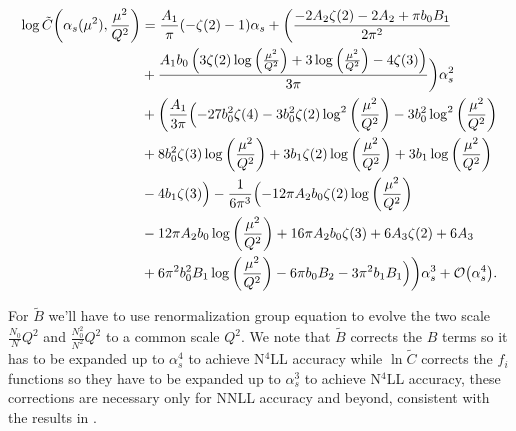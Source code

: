 \documentclass[../Tesi_Jiahao_Miao_986136.tex]{subfiles}
\begin{document}
\begin{align}
    \begin{split}
    \log \tilde{C}\qty(\alpha_s(\mu^2), \frac{\mu^2}{Q^2}) &= \frac{A_1}{\pi } (-\zeta (2)-1) \alpha_s + \biggl(\frac{-2 A_2 \zeta (2)-2 A_2+\pi  b_0 B_1}{2 \pi ^2}\\
    &+\frac{A_1 b_0 \left(3 \zeta (2) \log \left(\frac{\mu ^2}{Q^2}\right)+3 \log \left(\frac{\mu ^2}{Q^2}\right) -4 \zeta (3)\right)}{3 \pi }\biggr)\alpha_s^2\\
    &+\biggl(\frac{A_1}{3 \pi } \Bigl(-27 b_0^2 \zeta (4)-3 b_0^2 \zeta (2) \log ^2\left(\frac{\mu ^2}{Q^2}\right)-3 b_0^2 \log ^2\left(\frac{\mu ^2}{Q^2}\right)\\
    &+8 b_0^2 \zeta (3) \log \left(\frac{\mu ^2}{Q^2}\right)+3 b_1 \zeta (2) \log \left(\frac{\mu ^2}{Q^2}\right)+3 b_1 \log \left(\frac{\mu ^2}{Q^2}\right)\\
    &-4 b_1 \zeta (3)\Bigr)-\frac{1}{6 \pi ^3}\Bigl(-12 \pi  A_2 b_0 \zeta (2) \log \left(\frac{\mu ^2}{Q^2}\right)\\
    &-12 \pi  A_2 b_0 \log \left(\frac{\mu ^2}{Q^2}\right)+16 \pi  A_2 b_0 \zeta (3)+6 A_3 \zeta (2)+6 A_3\\
    &+6 \pi ^2 b_0^2 B_1 \log \left(\frac{\mu ^2}{Q^2}\right)-6 \pi  b_0 B_2 -3 \pi ^2 b_1 B_1\Bigr)\biggr)\alpha_s^3 + \order{\alpha_s^4}.
    \end{split}
\end{align}

For $\tilde{B}$ we'll have to use renormalization group equation to evolve the two scale $\frac{N_0}{N}Q^2$ and $\frac{N_0^2}{N^2}Q^2$ to a common scale $Q^2$.
We note that $\tilde{B}$ corrects the $B$ terms so it has to be expanded up to $\alpha_s^4$ to achieve N$^4$LL accuracy while
$\ln \tilde{C}$ corrects the $f_i$ functions so they have to be expanded up to $\alpha_s^3$ to achieve N$^4$LL accuracy, 
these corrections are necessary only for NNLL accuracy and beyond, consistent with the results in \cite{CATANI19933}.
\end{document}
